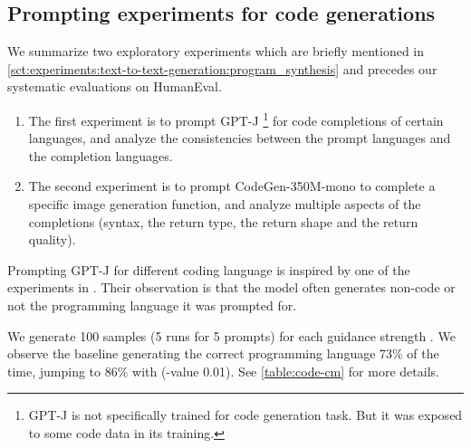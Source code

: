 \documentclass{article}
\begin{document}
\subsection{Prompting experiments for code generations}\label{appendix:additional-exp}
We summarize two exploratory experiments which are briefly mentioned in \ref{sct:experiments:text-to-text-generation:program_synthesis} and precedes our systematic evaluations on HumanEval. 
\begin{enumerate}
    \item The first experiment is to prompt GPT-J \cite{gpt-j}\footnote{GPT-J is not specifically trained for code generation task. But it was exposed to some code data in its training.} for code completions of certain languages, and analyze the consistencies between the prompt languages and the completion languages.
    \item The second experiment is to prompt CodeGen-350M-mono \cite{nijkamp2023codegen} to complete a specific image generation function, and analyze multiple aspects of the completions (syntax, the return type, the return shape and the return quality).
\end{enumerate}


Prompting GPT-J for different coding language is inspired by one of the experiments in \cite{moss}. Their observation is that the model often generates non-code or not the programming language it was prompted for.

We generate 100 samples (5 runs for 5 prompts) for each guidance strength . We observe the  baseline generating the correct programming language 73\% of the time, jumping to 86\% with  (-value 0.01). See \ref{table:code-cm} for more details.
\end{document}
